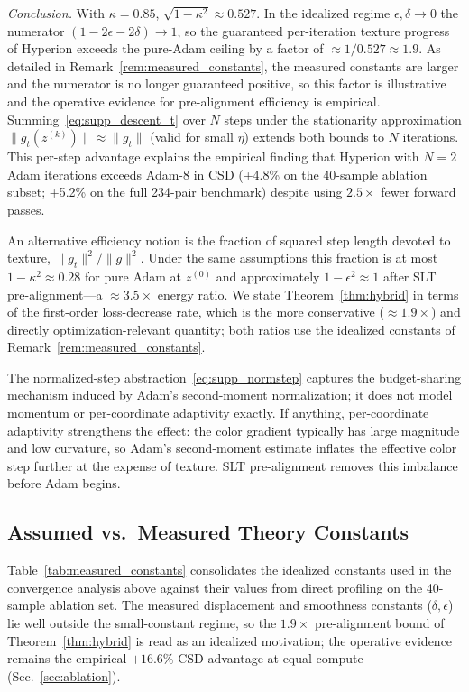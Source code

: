 \begin{IEEEproof}
\emph{Conclusion.}
With $\kappa = 0.85$, $\sqrt{1-\kappa^2} \approx 0.527$.
In the idealized regime $\epsilon, \delta \to 0$ the numerator
$(1-2\epsilon-2\delta) \to 1$, so the guaranteed per-iteration texture progress
of Hyperion exceeds the pure-Adam ceiling by a factor of
$\approx 1/0.527 \approx 1.9$.
As detailed in Remark~\ref{rem:measured_constants}, the measured constants are
larger and the numerator is no longer guaranteed positive, so this factor is
illustrative and the operative evidence for pre-alignment efficiency is
empirical.
Summing~\eqref{eq:supp_descent_t} over $N$ steps under the stationarity
approximation $\|g_t(z^{(k)})\| \approx \|g_t\|$ (valid for small $\eta$)
extends both bounds to $N$ iterations.
This per-step advantage explains the empirical finding that Hyperion with
$N=2$ Adam iterations exceeds Adam-8 in CSD (+4.8\% on the 40-sample ablation
subset; +5.2\% on the full 234-pair benchmark) despite using $2.5\times$
fewer forward passes.
\end{IEEEproof}

\begin{remark}
An alternative efficiency notion is the fraction of squared step length
devoted to texture, $\|g_t\|^2/\|g\|^2$.
Under the same assumptions this fraction is at most
$1-\kappa^2 \approx 0.28$ for pure Adam at $z^{(0)}$ and approximately
$1-\epsilon^2 \approx 1$ after SLT pre-alignment—a $\approx 3.5\times$
energy ratio.
We state Theorem~\ref{thm:hybrid} in terms of the first-order loss-decrease
rate, which is the more conservative ($\approx 1.9\times$) and directly
optimization-relevant quantity; both ratios use the idealized constants of
Remark~\ref{rem:measured_constants}.
\end{remark}

\begin{remark}
The normalized-step abstraction~\eqref{eq:supp_normstep} captures the
budget-sharing mechanism induced by Adam's second-moment normalization; it
does not model momentum or per-coordinate adaptivity exactly.
If anything, per-coordinate adaptivity strengthens the effect: the color
gradient typically has large magnitude and low curvature, so Adam's
second-moment estimate inflates the effective color step further at the
expense of texture.
SLT pre-alignment removes this imbalance before Adam begins.
\end{remark}

\subsection{Assumed vs.\ Measured Theory Constants}
\label{app:measured_constants}
Table~\ref{tab:measured_constants} consolidates the idealized constants used in
the convergence analysis above against their values from direct profiling on the
40-sample ablation set. The measured displacement and smoothness constants
($\delta, \epsilon$) lie well outside the small-constant regime, so the
$1.9\times$ pre-alignment bound of Theorem~\ref{thm:hybrid} is read as an
idealized motivation; the operative evidence remains the empirical $+16.6\%$ CSD
advantage at equal compute (Sec.~\ref{sec:ablation}).

